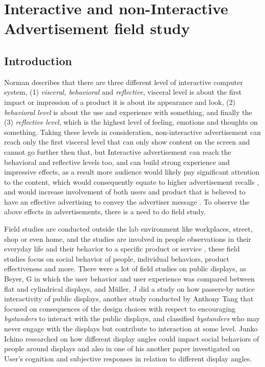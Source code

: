\chapter{Interactive and non-Interactive Advertisement field study} %

\label{Chapter8} %
\newpage

\section{Introduction}
Norman \cite{norman} describes that there are three different level of interactive computer system, (1) \emph{visceral, behavioral} and \emph{reflective}, visceral level is about the first impact or impression of a product it is about its appearance and look, (2) \emph{behavioral level} is about the use and experience with something, and finally the (3) \emph{reflective level}, which is the highest level of feeling, emotions and thoughts on something. Taking these levels in consideration, non-interactive advertisement can reach only the first visceral level that can only show content on the screen and cannot go further then that, but Interactive advertisement can reach the behavioral and reflective levels too, and can build strong experience and impressive effects, as a result more audience would likely pay significant attention to the content, which would consequently equate to higher advertisement recalls \cite{add_effectivenss}, and would increase involvement of both users and product that is believed to have an effective advertising to convey the advertiser message \cite{audience_involvement}. To observe the above effects in advertisements, there is a need to do field study.

Field studies are conducted outside the lab environment like workplaces, street, shop or even home, and the studies are involved in people observations in their everyday life and their behavior to a specific product or service \cite{field_study}, these field studies focus on social behavior of people, individual behaviors, product effectiveness and more. There were a lot of field studies on public displays, as Beyer, G \cite{CylindricalScreen} in which the user behavior and user experience was compared between flat and cylindrical displays, and Müller, J \cite{LookingGlass} did a study on how passers-by notice interactivity of public displays, another study conducted by Anthony Tang \cite{Bystanders} that focused on consequences of the design choices with respect to encouraging \emph{bystanders} to interact with the public displays, and classified \emph{bystanders} who may never engage with the displays but contribute to interaction at some level. Junko Ichino \cite{DisplayAngleEffect} researched on how different display angles could impact social behaviors of people around displays and also in one of his another paper \cite{DisplayAngleEffect2} investigated on User's cognition and subjective responses in relation to different display angles.

